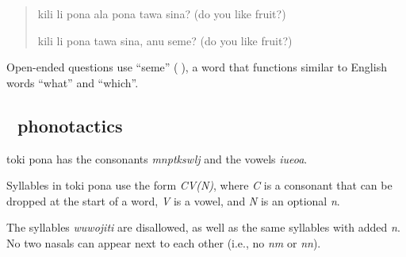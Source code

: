 \documentclass[statementpaper,oneside,article,14pt]{memoir}
\begin{document}
\begin{quote}
  kili li pona ala pona tawa sina? (do you like fruit?)

  kili li pona tawa sina, anu seme? (do you like fruit?)
\end{quote}
Open-ended questions use ``seme'' ({\sitpon󱥙}), a word that functions similar to
English words ``what'' and ``which''.

\subsection{{\sitpon󱤕} phonotactics}

toki pona has the consonants \textit{mnptkswlj} and the vowels \textit{iueoa}.

Syllables in toki pona use the form \textit{CV(N)}, where \textit{C} is a consonant 
that can be dropped at the start of a word, \textit{V} is a vowel, and \textit{N} is 
an optional \textit{n}.

The syllables \textit{wuwojiti} are disallowed, as well as the same syllables with added 
\textit{n}. No two nasals can appear next to each other (i.e., no \textit{nm} or \textit{nn}).
\end{document}
